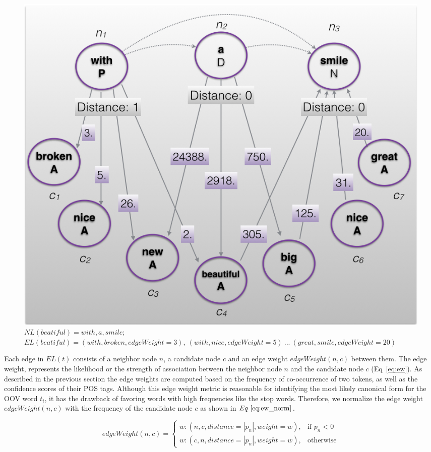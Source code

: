 \documentclass[a4paper,onesided,12pt]{report}
\begin{document}
\begin{figure}[htb]
\begin{center}
\includegraphics[scale=0.5]{fig/edgeWeight}
\caption{$NL(beatiful) = with, a, smile$; $EL(beatiful)=(with,broken,edgeWeight=3),~(with,nice,edgeWeight=5)~...~(great,smile,edgeWeight=20)$}
\label{fig:edgeWeight}
\end{center}
\end{figure}

Each edge in $EL(t)$ consists of a neighbor node $n$, a candidate node $c$ and an edge weight $edgeWeight(n,c)$ between them. The edge weight, represents the likelihood or the strength of association between the neighbor node $n$ and the candidate node $c$ (Eq~\ref{eq:ew}). As described in the previous section the edge weights are computed based on the frequency of co-occurrence of two tokens, as well as the confidence scores of their POS tags.
Although this edge weight metric is reasonable for identifying the most likely canonical form for the OOV word $t_i$, it has the drawback of favoring words with high frequencies like the stop words. Therefore, we normalize the edge weight $edgeWeight(n,c)$ with the frequency of the candidate node $c$ as shown in $Eq~\ref{eq:ew_norm}$.

\begin{equation}
edgeWeight(n,c) =
\begin{cases}
  w : (n,c,distance = |p_n|,weight=w), & \text{if } p_n < 0 \\
  w : (c,n,distance = |p_n|,weight=w), & \text{otherwise}
\end{cases}
\label{eq:ew}
\end{equation}
\end{document}
